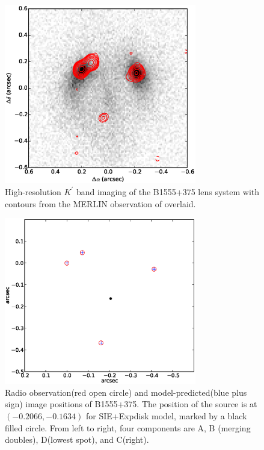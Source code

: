 \documentclass[useAMS,usenatbib]{mn2e}
\begin{document}
\begin{figure}
\includegraphics[width=84mm]{1555_ao_merlin_overlay.eps}
\caption{High-resolution  $K^\prime$ band imaging of the B1555+375 lens system 
with contours from the MERLIN observation of \citet{Marlow99} overlaid.
%
\label{fig:merlin}}
\end{figure}


\begin{figure}
\includegraphics[width=84mm]{point_source.eps}
\caption{Radio observation(red open circle) and model-predicted(blue plus sign) image positions of B1555+375. The position of the source is at $(-0.2066,-0.1634)$ for SIE+Expdisk model, marked by a black filled circle. From left to right, four components are A, B (merging doubles), D(lowest spot), and C(right).\label{fig2}}
\end{figure}
\end{document}
